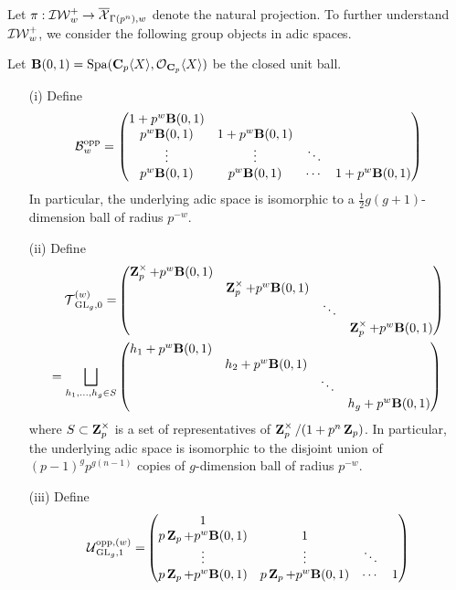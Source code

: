 Let $\pi: \operatorname{\mathcal{IW}}^+_w\rightarrow \overline{\operatorname{\mathcal{X}}}_{\Gamma(p^n),w}$ denote the natural projection. To further understand $\operatorname{\mathcal{IW}}^+_w$, we consider the following group objects in adic spaces.

\begin{Definition}\label{definition: torsors}
Let $\mathbf{B}(0,1)=\operatorname{Spa}(\operatorname{\mathbf{C}}_p\langle X\rangle, \operatorname{\mathcal{O}}_{\operatorname{\mathbf{C}}_p}\langle X\rangle)$ be the closed unit ball.
\begin{enumerate}
\item[(i)]
Define
$$\operatorname{\mathcal{B}}^{\operatorname{opp}}_w=\begin{pmatrix}1+p^w\mathbf{B}(0,1) \\ p^w\mathbf{B}(0,1) & 1+p^w\mathbf{B}(0,1)\\ \vdots & \vdots &  \ddots\\ p^w\mathbf{B}(0,1) & p^w\mathbf{B}(0,1) & \cdots & 1+p^w\mathbf{B}(0,1)\end{pmatrix}$$
In particular, the underlying adic space is isomorphic to a $\frac{1}{2}g(g+1)$-dimension ball of radius $p^{-w}$.
\item[(ii)]
Define
\begin{align*}
\operatorname{\mathcal{T}}_{\operatorname{GL}_g,0}^{(w)}=&\begin{pmatrix}\operatorname{\mathbf{Z}}_p^{\times}+p^w\mathbf{B}(0,1) \\  & \operatorname{\mathbf{Z}}_p^{\times}+p^w\mathbf{B}(0,1)\\  &  &  \ddots\\  &  & & \operatorname{\mathbf{Z}}_p^{\times}+p^w\mathbf{B}(0,1)\end{pmatrix}\\
=\bigsqcup_{h_1, \ldots, h_g\in S}&\begin{pmatrix}h_1+p^w\mathbf{B}(0,1) \\  & h_2+p^w\mathbf{B}(0,1)\\  &  &  \ddots\\  &  & & h_g+p^w\mathbf{B}(0,1)\end{pmatrix}
\end{align*}
where $S\subset \operatorname{\mathbf{Z}}_p^{\times}$ is a set of representatives of $\operatorname{\mathbf{Z}}_p^{\times}/(1+p^n\operatorname{\mathbf{Z}}_p)$. In particular, the underlying adic space is isomorphic to the disjoint union of $(p-1)^gp^{g(n-1)}$ copies of $g$-dimension ball of radius $p^{-w}$.
\item[(iii)]
Define
\begin{align*}
\calU^{\opp, (w)}_{\GL_g,1}=&\begin{pmatrix}1 \\ p\Z_p+p^w\mathbf{B}(0,1) & 1\\ \vdots & \vdots &  \ddots\\ p\Z_p+p^w\mathbf{B}(0,1) & p\Z_p+p^w\mathbf{B}(0,1) & \cdots & 1\end{pmatrix}\\

\end{align*}
\end{enumerate}
\end{Definition}
